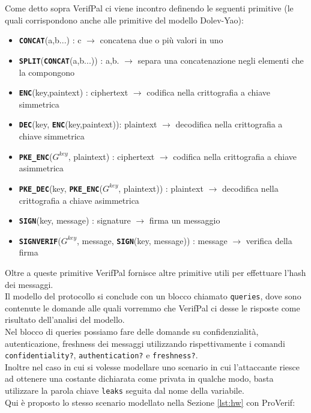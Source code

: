 Come detto sopra VerifPal ci viene incontro definendo le seguenti primitive (le quali corrispondono anche alle primitive del modello Dolev-Yao): 
\begin{itemize}
    \item \textbf{\texttt{CONCAT}}(a,b...) : c $\rightarrow$ concatena due o più valori in uno
    \item \textbf{\texttt{SPLIT}}(\textbf{\texttt{CONCAT}}(a,b...)) : a,b. $\rightarrow$ separa una concatenazione negli elementi che la compongono
    \item \textbf{\texttt{ENC}}(key,paintext) : ciphertext $\rightarrow$ codifica nella crittografia a chiave simmetrica
    \item \textbf{\texttt{DEC}}(key, \textbf{\texttt{ENC}}(key,paintext)): plaintext $\rightarrow$ decodifica nella crittografia a chiave simmetrica
    \item \textbf{\texttt{PKE\_ENC}}($G^{key}$, plaintext) : ciphertext $\rightarrow$ codifica nella crittografia a chiave asimmetrica
    \item \textbf{\texttt{PKE\_DEC}}(key, \textbf{\texttt{PKE\_ENC}}($G^{key}$, plaintext)) : plaintext $\rightarrow$ decodifica nella crittografia a chiave asimmetrica
    \item \textbf{\texttt{SIGN}}(key, message) : signature $\rightarrow$ firma un messaggio
    \item \textbf{\texttt{SIGNVERIF}}($G^{key}$, message, \textbf{\texttt{SIGN}}(key, message)) : message $\rightarrow$ verifica della firma
\end{itemize}

\noindent Oltre a queste primitive VerifPal fornisce altre primitive utili per effettuare l'hash dei messaggi.\\
Il modello del protocollo si conclude con un blocco chiamato \texttt{queries}, dove sono contenute le domande alle quali vorremmo che VerifPal ci desse le risposte come risultato dell'analisi del modello.\\
Nel blocco di queries possiamo fare delle domande su confidenzialità, autenticazione, freshness dei messaggi utilizzando rispettivamente i comandi \texttt{confidentiality?}, \texttt{authentication?} e \texttt{freshness?}.\\%
Inoltre nel caso in cui si volesse modellare uno scenario in cui l'attaccante riesce ad ottenere una costante dichiarata come privata in qualche modo, basta utilizzare la parola chiave \texttt{leaks} seguita dal nome della variabile.\\
Qui è proposto lo stesso scenario modellato nella Sezione \ref*{lst:hw} con ProVerif:

